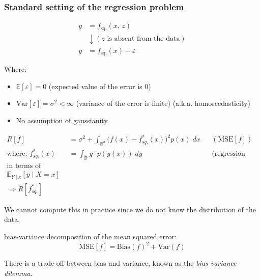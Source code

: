 \subsubsection{Standard setting of the regression problem}

\begin{align*}
	y & = f_\text{sq.}(x,\, z)                         \\
	  & \downarrow (z \text{ is absent from the data}) \\
	y & = f_\text{sq.}(x) + \varepsilon
\end{align*}

Where:
\begin{itemize}
	\item \(\mathds{E}[\varepsilon] = 0\) (expected value of the error is 0)
	\item \(\text{Var}[\varepsilon] = \sigma^2 < \infty\) (variance of the error is finite) (a.k.a. homoscedasticity)
	\item No assumption of gaussianity
\end{itemize}

\begin{prop}{}{}
	\begin{align*}
		R[f]                       & = \sigma^2 + \int_{\mathds{R}^d} \bigl(f(x) - f^*_{sq.}(x)\bigr)^2 p(x)\; dx
		                           &                                                                    & (\text{MSE}[f])              \\
		\text{where: } f^*_{sq.}(x) & = \int_{\mathds{R}} y\cdot p(y(x))\; dy
		                           &                                                                    & \text{(regression function)} \\
		\text{in terms of statistics: }                                                                                                \\ \mathds{E}_{Y \mid x}[y \mid X = x] \\
		\Rightarrow R[f^*_{sq.}]
	\end{align*}
	\tcblower
	\begin{note}
		We cannot compute this in practice since we do not know the distribution
		of the data.
	\end{note}
\end{prop}

\begin{prop}{bias-variance decomposition}{}
	of the mean squared error:
  \[\text{MSE}[f] = \text{Bias}(f)^2 + \text{Var}(f)
	\]

	There is a trade-off between bias and variance, known as the
	\emph{bias-variance dilemma}.
\end{prop}

